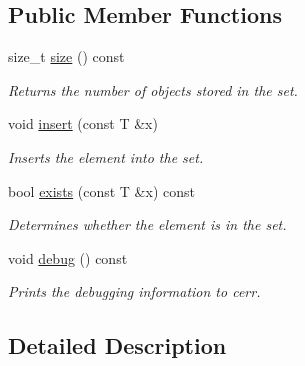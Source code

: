 \subsection*{Public Member Functions}
\begin{DoxyCompactItemize}
\item 
\hypertarget{class_std_tree_set_a842965914d664c4038d2686fbdc674ac}{size\-\_\-t \hyperlink{class_std_tree_set_a842965914d664c4038d2686fbdc674ac}{size} () const }\label{class_std_tree_set_a842965914d664c4038d2686fbdc674ac}

\begin{DoxyCompactList}\small\item\em Returns the number of objects stored in the set. \end{DoxyCompactList}\item 
\hypertarget{class_std_tree_set_aba8ab0c22468935472982b48e6eeef46}{void \hyperlink{class_std_tree_set_aba8ab0c22468935472982b48e6eeef46}{insert} (const T \&x)}\label{class_std_tree_set_aba8ab0c22468935472982b48e6eeef46}

\begin{DoxyCompactList}\small\item\em Inserts the element into the set. \end{DoxyCompactList}\item 
\hypertarget{class_std_tree_set_a6cb54379f9ebbc21162bd50fcb1a40d6}{bool \hyperlink{class_std_tree_set_a6cb54379f9ebbc21162bd50fcb1a40d6}{exists} (const T \&x) const }\label{class_std_tree_set_a6cb54379f9ebbc21162bd50fcb1a40d6}

\begin{DoxyCompactList}\small\item\em Determines whether the element is in the set. \end{DoxyCompactList}\item 
\hypertarget{class_std_tree_set_aece05dc24990b35f85de36087345556c}{void \hyperlink{class_std_tree_set_aece05dc24990b35f85de36087345556c}{debug} () const }\label{class_std_tree_set_aece05dc24990b35f85de36087345556c}

\begin{DoxyCompactList}\small\item\em Prints the debugging information to cerr. \end{DoxyCompactList}\end{DoxyCompactItemize}


\subsection{Detailed Description}
